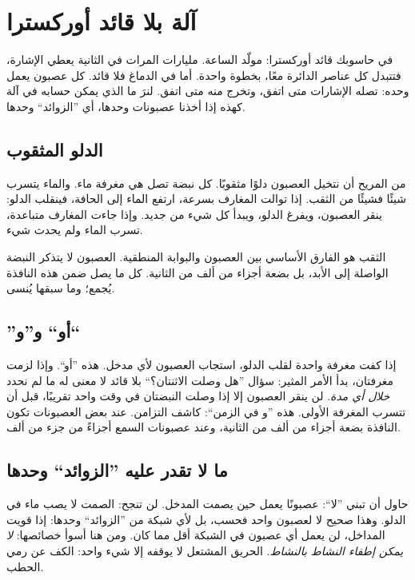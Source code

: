 \chapter{آلة بلا قائد أوركسترا}

في حاسوبك قائد أوركسترا: مولّد الساعة. مليارات المرات في الثانية يعطي الإشارة، فتتبدل كل عناصر الدائرة معًا، بخطوة واحدة. أما في الدماغ فلا قائد. كل عصبون يعمل وحده: تصله الإشارات متى اتفق، وتخرج منه متى اتفق. لنرَ ما الذي يمكن حسابه في آلة كهذه إذا أخذنا عصبونات  وحدها، أي ”الزوائد“ وحدها.

\section*{الدلو المثقوب}

من المريح أن نتخيل العصبون دلوًا مثقوبًا. كل نبضة تصل هي مغرفة ماء. والماء يتسرب شيئًا فشيئًا من الثقب. إذا توالت المغارف بسرعة، ارتفع الماء إلى الحافة، فينقلب الدلو: ينقر العصبون، ويفرغ الدلو، ويبدأ كل شيء من جديد. وإذا جاءت المغارف متباعدة، تسرب الماء ولم يحدث شيء.


الثقب هو الفارق الأساسي بين العصبون والبوابة المنطقية. العصبون لا يتذكر النبضة الواصلة إلى الأبد، بل بضعة أجزاء من ألف من الثانية. كل ما يصل ضمن هذه النافذة يُجمع؛ وما سبقها يُنسى.

\section*{”أو“ و”و“}

إذا كفت مغرفة واحدة لقلب الدلو، استجاب العصبون لأي مدخل. هذه ”أو“. وإذا لزمت مغرفتان، بدأ الأمر المثير: سؤال ”هل وصلت الاثنتان؟“ بلا قائد لا معنى له ما لم نحدد \emph{خلال أي مدة}. لن ينقر العصبون إلا إذا وصلت النبضتان في وقت واحد تقريبًا، قبل أن تتسرب المغرفة الأولى. هذه ”و في الزمن“: كاشف التزامن. عند بعض العصبونات تكون النافذة بضعة أجزاء من ألف من الثانية، وعند عصبونات السمع أجزاءً من جزء من ألف.

\section*{ما لا تقدر عليه ”الزوائد“ وحدها}

حاول أن تبني ”لا“: عصبونًا يعمل حين يصمت المدخل. لن تنجح: الصمت لا يصب ماء في الدلو. وهذا صحيح لا لعصبون واحد فحسب، بل لأي شبكة من ”الزوائد“ وحدها: إذا قويت المداخل، لن يعمل أي عصبون في الشبكة أقل مما كان. ومن هنا أسوأ خصائصها: \emph{لا يمكن إطفاء النشاط بالنشاط}. الحريق المشتعل لا يوقفه إلا شيء واحد: الكف عن رمي الحطب.

